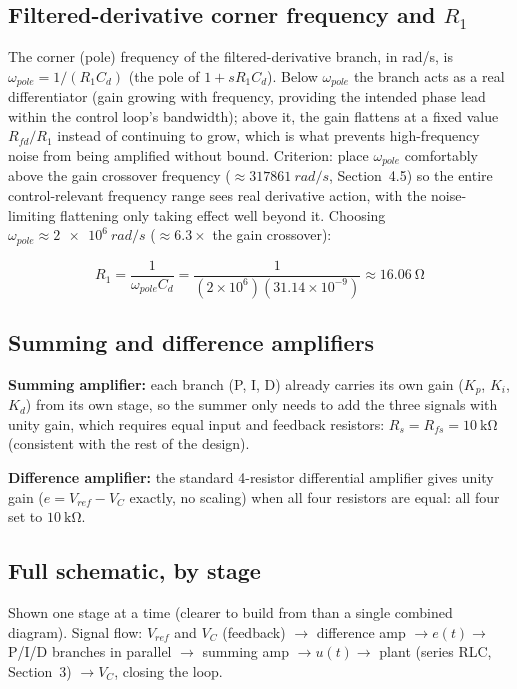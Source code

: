 \documentclass[11pt,letterpaper]{article}
\begin{document}
\subsection*{Filtered-derivative corner frequency and $R_1$}

The corner (pole) frequency of the filtered-derivative branch, in rad/s, is $\omega_{pole}=1/(R_1C_d)$
(the pole of $1+sR_1C_d$). Below $\omega_{pole}$ the branch acts as a real differentiator (gain growing
with frequency, providing the intended phase lead within the control loop's bandwidth); above it, the
gain flattens at a fixed value $R_{fd}/R_1$ instead of continuing to grow, which is what prevents
high-frequency noise from being amplified without bound. Criterion: place $\omega_{pole}$ comfortably
above the gain crossover frequency ($\approx\SI{317861}{rad/s}$, Section~4.5) so the entire
control-relevant frequency range sees real derivative action, with the noise-limiting flattening only
taking effect well beyond it. Choosing $\omega_{pole}\approx\SI{2e6}{rad/s}$ ($\approx6.3\times$ the gain
crossover):

\begin{equation}
R_1 = \frac{1}{\omega_{pole}C_d} = \frac{1}{(2\times10^6)(31.14\times10^{-9})} \approx \boxed{\SI{16.06}{\ohm}}
\end{equation}

\subsection*{Summing and difference amplifiers}

\textbf{Summing amplifier:} each branch (P, I, D) already carries its own gain ($K_p$, $K_i$, $K_d$)
from its own stage, so the summer only needs to add the three signals with unity gain, which requires
equal input and feedback resistors: $R_s=R_{fs}=\SI{10}{\kilo\ohm}$ (consistent with the rest of the
design).

\textbf{Difference amplifier:} the standard 4-resistor differential amplifier gives unity gain
($e=V_{ref}-V_C$ exactly, no scaling) when all four resistors are equal: all four set to
$\SI{10}{\kilo\ohm}$.

\subsection{Full schematic, by stage}

Shown one stage at a time (clearer to build from than a single combined diagram). Signal flow:
$V_{ref}$ and $V_C$ (feedback) $\to$ difference amp $\to e(t) \to$ P/I/D branches in parallel
$\to$ summing amp $\to u(t) \to$ plant (series RLC, Section~3) $\to V_C$, closing the loop.
\end{document}
